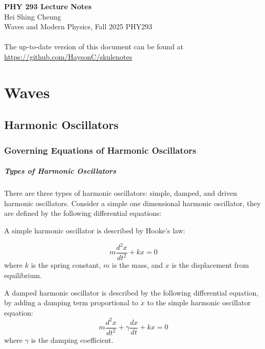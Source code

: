 \documentclass[11pt]{report}
\begin{document}
\thispagestyle{empty}
{\LARGE \bf PHY 293 Lecture Notes}\\
{\large Hei Shing Cheung}\\
Waves and Modern Physics, Fall 2025 \hfill PHY293\\
\\
The up-to-date version of this document can be found at \url{https://github.com/HaysonC/skulenotes}\\

\chapter{Waves}
\section{Harmonic Oscillators}

\subsection{Governing Equations of Harmonic Oscillators}

\paragraph{Types of Harmonic Oscillators} There are three types of harmonic oscillators: simple, damped, and driven harmonic oscillators. Consider a simple one dimensional harmonic oscillator, they are defined by the following differential equations:

\begin{definition}
    A simple harmonic oscillator is described by Hooke's law:

    \begin{equation} \label{eq:hooke}
        m \frac{d^2 x}{dt^2} + kx = 0
    \end{equation}
    where \( k \) is the spring constant, \( m \) is the mass, and \( x \) is the displacement from equilibrium.
\end{definition}

\begin{definition}
    A damped harmonic oscillator is described by the following differential equation, by adding a damping term proportional to $\dot{x}$ to the simple harmonic oscillator equation:
    \begin{equation}
        m \frac{d^2 x}{dt^2} + \gamma \frac{dx}{dt} + kx = 0   
    \end{equation}
    where \( \gamma \) is the damping coefficient.
\end{definition}
\end{document}
